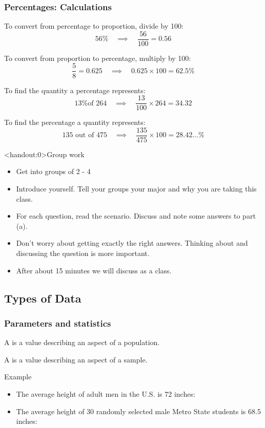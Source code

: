 \documentclass[xcolor=table, handout]{beamer}
\begin{document}
\begin{frame}
\frametitle{Percentages: Calculations}
\begin{exampleblock}{}
To convert from percentage to proportion, divide by 100:
\[56\% \quad \implies \quad \frac {56}{100} = 0.56\]

To convert from proportion to percentage, multiply by 100:
\[\frac 5 8 = 0.625 \quad \implies \quad 0.625 \times 100 = 62.5\%\]

To find the quantity a percentage represents:
\[\text{13\% of 264}\quad \implies \quad \frac {13}{100} \times 264 = 34.32\]

To find the percentage a quantity represents:
\[\text{135 out of 475} \quad \implies \quad \frac {135}{475} \times 100 = 28.42\ldots \%\]
\end{exampleblock}
\end{frame}

\begin{frame}<handout:0>{Group work}
\begin{block}{}
\large
\begin{itemize}
\item Get into groups of 2 - 4
\item Introduce yourself. Tell your groups your major and why you are taking this class. 
\item For each question, read the scenario. Discuss and note some answers to part (a).
\item Don't worry about getting exactly the right answers. Thinking about and discussing the question is more important.
\item After about 15 minutes we will discuss as a class. 
\end{itemize}
\end{block}
\end{frame}



\subsection{Types of Data}

\begin{frame}
\frametitle{Parameters and statistics}

\begin{block}{}
\large A  is a value describing an aspect of a population.
\end{block}
\pause
\begin{block}{}
\large A  is a value describing an aspect of a sample.
\end{block}
\pause
\begin{exampleblock}{Example}
\begin{itemize}
\item The average height of adult men in the U.S. is 72 inches: 

\item The average height of 30 randomly selected male Metro State students is 68.5 inches: 
\end{itemize}
\end{exampleblock}

\end{frame}
\end{document}

